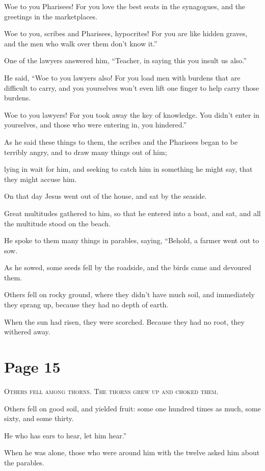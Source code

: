 Woe to you Pharisees! For you love the best seats in the synagogues, and the greetings in the marketplaces.

Woe to you, scribes and Pharisees, hypocrites! For you are like hidden graves, and the men who walk over them don’t know it.”

One of the lawyers answered him, “Teacher, in saying this you insult us also.”

He said, “Woe to you lawyers also! For you load men with burdens that are difficult to carry, and you yourselves won’t even lift one finger to help carry those burdens.

Woe to you lawyers! For you took away the key of knowledge. You didn’t enter in yourselves, and those who were entering in, you hindered.”

As he said these things to them, the scribes and the Pharisees began to be terribly angry, and to draw many things out of him;

lying in wait for him, and seeking to catch him in something he might say, that they might accuse him.

On that day Jesus went out of the house, and sat by the seaside.

Great multitudes gathered to him, so that he entered into a boat, and sat, and all the multitude stood on the beach.

He spoke to them many things in parables, saying, “Behold, a farmer went out to sow.

As he sowed, some seeds fell by the roadside, and the birds came and devoured them.

Others fell on rocky ground, where they didn’t have much soil, and immediately they sprang up, because they had no depth of earth.

When the sun had risen, they were scorched. Because they had no root, they withered away.



\chapterornament
\section*{Page 15}

\lettrine{O}{thers fell among thorns. The thorns grew up and choked them.}

Others fell on good soil, and yielded fruit: some one hundred times as much, some sixty, and some thirty.

He who has ears to hear, let him hear.”

When he was alone, those who were around him with the twelve asked him about the parables.

